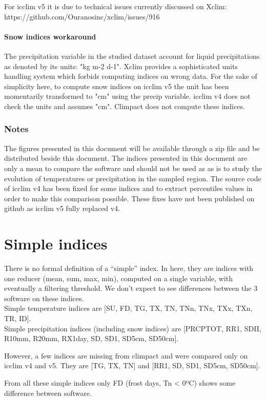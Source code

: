 \documentclass[a4paper,11pt]{article}
\begin{document}
    For icclim v5 it is due to technical issues currently discussed on Xclim: https://github.com/Ouranosinc/xclim/issues/916
\subsection{Snow indices workaround}
    The precipitation variable in the studied dataset account for liquid precipitations as denoted by its units: "kg m-2 d-1".
    Xclim provides a sophisticated units handling system which forbids computing indices on wrong data. For the sake of simplicity here, to compute snow indices on icclim v5 the unit has been momentarily transformed to "cm" using the precip variable.
    icclim v4 does not check the units and assumes "cm".
    Climpact does not compute these indices.
\section{Notes}
    The figures presented in this document will be available through a zip file and be distributed beside this document.
    The indices presented in this document are only a mean to compare the software and should not be used as as is to study the evolution of temperatures or precipitation in the sampled region.
    The source code of icclim v4 has been fixed for some indices and to extract percentiles values in order to make this comparison possible. These fixes have not been published on github as icclim v5 fully replaced v4.

\part{Simple indices}
    There is no formal definition of a “simple” index. In here, they are indices with one reducer (mean, sum, max, min), computed on a single variable, with eventually a filtering threshold. We don’t expect to see differences between the 3 software on these indices.\\
    Simple temperature indices are [SU, FD, TG, TX, TN, TNn, TNx, TXx, TXn, TR, ID].\\
    Simple precipitation indices (including snow indices) are [PRCPTOT, RR1, SDII, R10mm, R20mm, RX1day, SD, SD1, SD5cm, SD50cm].

    However, a few indices are missing from climpact and were compared only on icclim v4 and v5. They are [TG, TX, TN] and [RR1, SD, SD1, SD5cm, SD50cm].

    From all these simple indices only FD (frost days, Tn < 0ºC) shows some difference between software.
\end{document}
